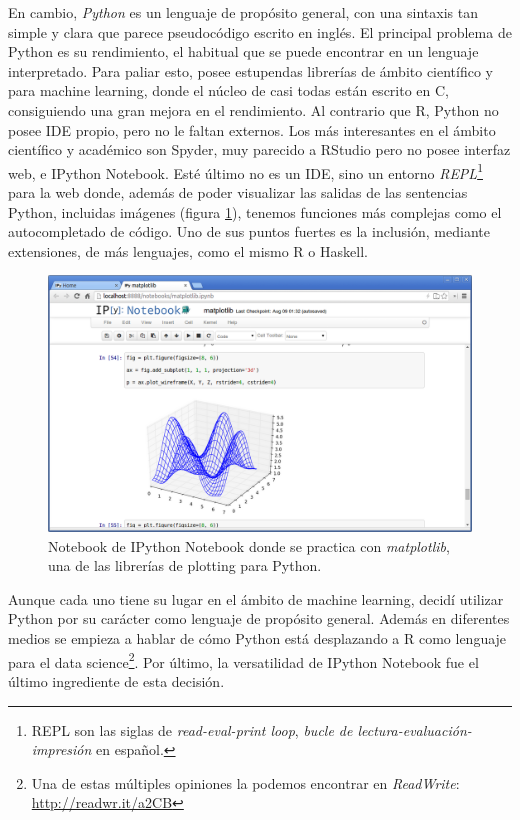 En cambio, \emph{Python} es un lenguaje de propósito general, con una sintaxis tan simple y clara que parece pseudocódigo escrito en inglés. El principal problema de Python es su rendimiento, el habitual que se puede encontrar en un lenguaje interpretado. Para paliar esto, posee estupendas librerías de ámbito científico y para machine learning, donde el núcleo de casi todas están escrito en C, consiguiendo una gran mejora en el rendimiento. Al contrario que R, Python no posee IDE propio, pero no le faltan externos. Los más interesantes en el ámbito científico y académico son Spyder, muy parecido a RStudio pero no posee interfaz web, e IPython Notebook. Esté último no es un IDE, sino un entorno \emph{REPL}\footnote{REPL son las siglas de \emph{read-eval-print loop}, \emph{bucle de lectura-evaluación-impresión} en español.} para la web donde, además de poder visualizar las salidas de las sentencias Python, incluidas imágenes (figura \ref{fig:4.2}), tenemos funciones más complejas como el autocompletado de código. Uno de sus puntos fuertes es la inclusión, mediante extensiones, de más lenguajes, como el mismo R o Haskell.

\begin{figure}[H]
  \centering
  \includegraphics[width=140mm]{figures/ch_04/ipython_notebook.png}
  \caption{Notebook de IPython Notebook donde se practica con \emph{matplotlib}, una de las librerías de plotting para Python.}
  \label{fig:4.2}
\end{figure}

Aunque cada uno tiene su lugar en el ámbito de machine learning, decidí utilizar Python por su carácter como lenguaje de propósito general. Además en diferentes medios se empieza a hablar de cómo Python está desplazando a R como lenguaje para el data science\footnote{Una de estas múltiples opiniones la podemos encontrar en \emph{ReadWrite}: \url{http://readwr.it/a2CB}}. Por último, la versatilidad de IPython Notebook fue el último ingrediente de esta decisión.

